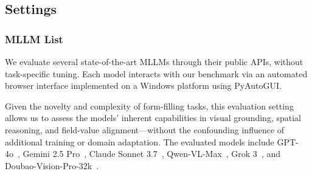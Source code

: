 \documentclass[sigconf, screen, review]{acmart}
\newcommand{\bobo}[1]{%
  \begin{CJK}{UTF8}{gbsn} %
  {\color{cyan}Bobo: #1}%
  \end{CJK}%
}
\begin{document}
\subsection{Settings}




\subsubsection{MLLM List}
We evaluate several state-of-the-art MLLMs through their public APIs, without task-specific tuning. Each model interacts with our benchmark via an automated browser interface implemented on a Windows platform using PyAutoGUI.

Given the novelty and complexity of form-filling tasks, this evaluation setting allows us to assess the models’ inherent capabilities in visual grounding, spatial reasoning, and field-value alignment—without the confounding influence of additional training or domain adaptation.
The evaluated models include GPT-4o~\cite{openai2024gpt4ocard}, Gemini 2.5 Pro~\cite{gemini}, Claude Sonnet 3.7~\cite{claude3sonnet}, Qwen-VL-Max~\cite{qwenvlmax}, Grok 3~\cite{grok32024}, and Doubao-Vision-Pro-32k~\cite{doubao}.



\end{document}
